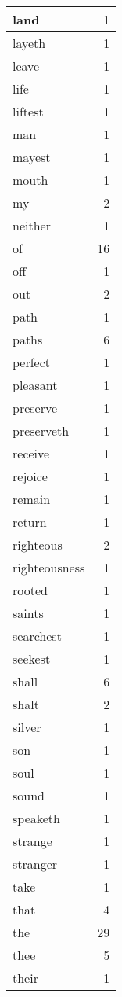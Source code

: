 \begin{center}
\begin{longtable}{l|r}
land & 1\\ \hline 
layeth & 1\\ \hline 
leave & 1\\ \hline 
life & 1\\ \hline 
liftest & 1\\ \hline 
man & 1\\ \hline 
mayest & 1\\ \hline 
mouth & 1\\ \hline 
my & 2\\ \hline 
neither & 1\\ \hline 
of & 16\\ \hline 
off & 1\\ \hline 
out & 2\\ \hline 
path & 1\\ \hline 
paths & 6\\ \hline 
perfect & 1\\ \hline 
pleasant & 1\\ \hline 
preserve & 1\\ \hline 
preserveth & 1\\ \hline 
receive & 1\\ \hline 
rejoice & 1\\ \hline 
remain & 1\\ \hline 
return & 1\\ \hline 
righteous & 2\\ \hline 
righteousness & 1\\ \hline 
rooted & 1\\ \hline 
saints & 1\\ \hline 
searchest & 1\\ \hline 
seekest & 1\\ \hline 
shall & 6\\ \hline 
shalt & 2\\ \hline 
silver & 1\\ \hline 
son & 1\\ \hline 
soul & 1\\ \hline 
sound & 1\\ \hline 
speaketh & 1\\ \hline 
strange & 1\\ \hline 
stranger & 1\\ \hline 
take & 1\\ \hline 
that & 4\\ \hline 
the & 29\\ \hline 
thee & 5\\ \hline 
their & 1\\ \hline 

\end{longtable}
\end{center}
